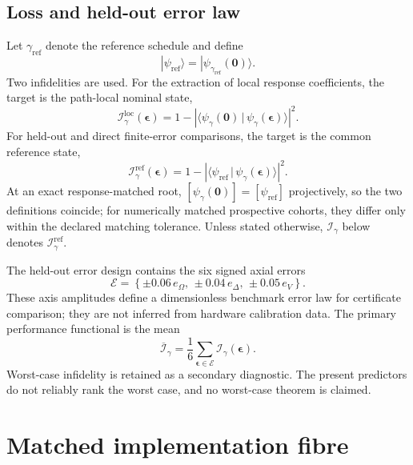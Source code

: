 \documentclass[11pt]{article}
\newcommand{\cI}{\mathcal{I}}
\begin{document}
\subsection{Loss and held-out error law}

Let $\gamma_{\mathrm{ref}}$ denote the reference schedule and define
\[
|\psi_{\mathrm{ref}}\rangle
=|\psi_{\gamma_{\mathrm{ref}}}(\mathbf{0})\rangle.
\]
Two infidelities are used. For the extraction of local response coefficients, the target is the path-local nominal state,
\begin{equation}
\cI^{\mathrm{loc}}_\gamma(\boldsymbol{\epsilon})
=
1-\left|
\langle\psi_\gamma(\mathbf{0})\,|\,\psi_\gamma(\boldsymbol{\epsilon})\rangle
\right|^2.
\label{eq:infidelityloc}
\end{equation}
For held-out and direct finite-error comparisons, the target is the common reference state,
\begin{equation}
\cI^{\mathrm{ref}}_\gamma(\boldsymbol{\epsilon})
=1-\left|
\langle\psi_{\mathrm{ref}}\,|\,
\psi_\gamma(\boldsymbol{\epsilon})\rangle
\right|^2.
\label{eq:infidelity}
\end{equation}
At an exact response-matched root, $[\psi_\gamma(\mathbf{0})]=[\psi_{\mathrm{ref}}]$ projectively, so the two definitions coincide; for numerically matched prospective cohorts, they differ only within the declared matching tolerance. Unless stated otherwise, $\cI_\gamma$ below denotes $\cI^{\mathrm{ref}}_\gamma$.

The held-out error design contains the six signed axial errors
\begin{equation}
\mathcal{E}
=
\left\{
\pm0.06\,e_\Omega,\,
\pm0.04\,e_\Delta,\,
\pm0.05\,e_V
\right\}.
\label{eq:errorlaw}
\end{equation}
These axis amplitudes define a dimensionless benchmark error law for
certificate comparison; they are not inferred from hardware calibration
data. The primary performance functional is the mean
\begin{equation}
\overline{\cI}_\gamma
=\frac{1}{6}
\sum_{\boldsymbol{\epsilon}\in\mathcal{E}}
\cI_\gamma(\boldsymbol{\epsilon}).
\label{eq:meanloss}
\end{equation}
Worst-case infidelity is retained as a secondary diagnostic. The present predictors do not reliably rank the worst case, and no worst-case theorem is claimed.

\section{Matched implementation fibre}
\end{document}
